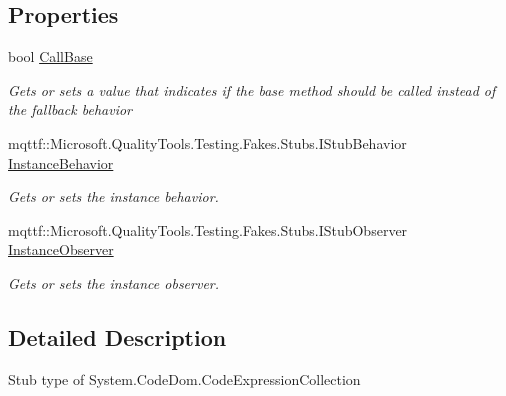 \subsection*{Properties}
\begin{DoxyCompactItemize}
\item 
bool \hyperlink{class_system_1_1_code_dom_1_1_fakes_1_1_stub_code_expression_collection_a959a5df2d047bd667ffb476a0ecc0e5f}{Call\-Base}
\begin{DoxyCompactList}\small\item\em Gets or sets a value that indicates if the base method should be called instead of the fallback behavior\end{DoxyCompactList}\item 
mqttf\-::\-Microsoft.\-Quality\-Tools.\-Testing.\-Fakes.\-Stubs.\-I\-Stub\-Behavior \hyperlink{class_system_1_1_code_dom_1_1_fakes_1_1_stub_code_expression_collection_ac26254ee9297b6764c1cfec8debb778f}{Instance\-Behavior}
\begin{DoxyCompactList}\small\item\em Gets or sets the instance behavior.\end{DoxyCompactList}\item 
mqttf\-::\-Microsoft.\-Quality\-Tools.\-Testing.\-Fakes.\-Stubs.\-I\-Stub\-Observer \hyperlink{class_system_1_1_code_dom_1_1_fakes_1_1_stub_code_expression_collection_a2190b7bb115960b458f1d0de4474399e}{Instance\-Observer}
\begin{DoxyCompactList}\small\item\em Gets or sets the instance observer.\end{DoxyCompactList}\end{DoxyCompactItemize}


\subsection{Detailed Description}
Stub type of System.\-Code\-Dom.\-Code\-Expression\-Collection



